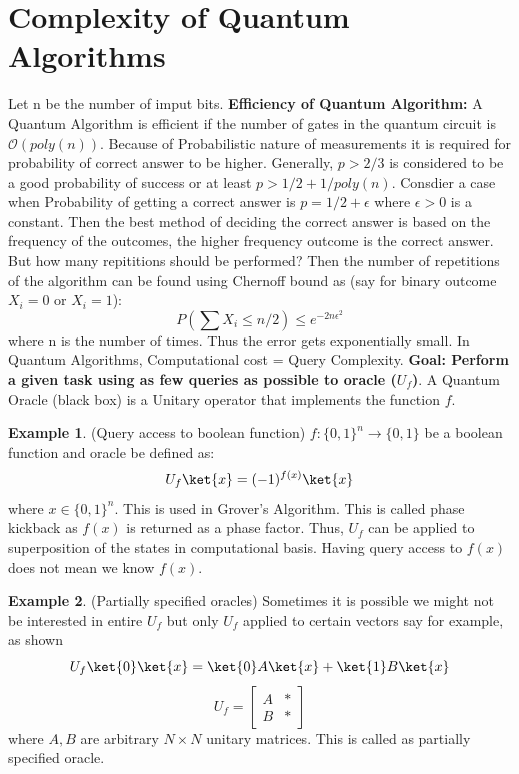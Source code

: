 \documentclass[12pt, oneside]{book}
\theoremstyle{definition}
\theoremstyle{definition}
\newtheorem{example}{Example}[section]
\theoremstyle{remark}
\begin{document}
\section{Complexity of Quantum Algorithms}
Let n be the number of imput bits. \textbf{Efficiency of Quantum Algorithm: } A Quantum Algorithm
is efficient if the number of gates in the quantum circuit is $\mathcal{O}(poly(n))$.
Because of Probabilistic nature of measurements it is required for probability of correct answer to be higher.
Generally, $p>2/3$ is considered to be a good probability of success or at least $p>1/2 + 1/poly(n)$.
Consdier a case when Probability of getting a correct answer is $p=1/2+\epsilon$ where $\epsilon>0$ is a constant.
Then the best method of deciding the correct answer is based on the frequency of the outcomes, the higher frequency outcome 
is the correct answer. But how many repititions should be performed? Then the number of repetitions of the algorithm
can be found using Chernoff bound as (say for binary outcome $X_i=0$ or $X_i=1$):
\[P(\sum X_i \leq n/2) \leq e^{-2n\epsilon^2}\] 
where n is the number of times. Thus the error gets exponentially small.
In Quantum Algorithms, Computational cost = Query Complexity. \textbf{Goal: Perform a given task using 
as few queries as possible to oracle ($U_f$)}. A Quantum Oracle (black box) is a Unitary operator that implements the function $f$.
\begin{example}
    (Query access to boolean function) $f:\{0,1\}^n \rightarrow \{0,1\}$ be a boolean function and oracle be defined as:
    \[ U_f\ket{x}=(-1)^{f(x)}\ket{x} \]
    where $x \in \{0,1\}^n$. This is used in Grover's Algorithm. This is called phase kickback as $f(x)$ is returned as a phase factor.
    Thus, $U_f$ can be applied to superposition of the states in computational basis.
    Having query access to $f(x)$ does not mean we know $f(x)$.
\end{example}
\begin{example}
    (Partially specified oracles) Sometimes it is possible we might not be interested in entire $U_f$ but only $U_f$ applied to certain vectors
    say for example, as shown
    \[ U_f\ket{0}\ket{x}=\ket{0}A\ket{x}+\ket{1}B\ket{x}\]
    \[U_f=\begin{bmatrix} A & * \\ B & * \end{bmatrix}\]
    where $A,B$ are arbitrary $ N \times N$ unitary matrices. This is called as partially specified oracle.
\end{example}
\end{document}
